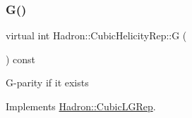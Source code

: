 \subsubsection{\texorpdfstring{G()}{G()}\hspace{0.1cm}{\footnotesize\ttfamily [1/3]}}
{\footnotesize\ttfamily virtual int Hadron\+::\+Cubic\+Helicity\+Rep\+::G (\begin{DoxyParamCaption}{ }\end{DoxyParamCaption}) const\hspace{0.3cm}{\ttfamily [pure virtual]}}

G-\/parity if it exists 

Implements \mbox{\hyperlink{structHadron_1_1CubicLGRep_ace26f7b2d55e3a668a14cb9026da5231}{Hadron\+::\+Cubic\+L\+G\+Rep}}.



